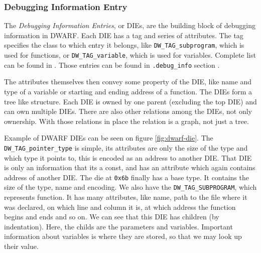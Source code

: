 \subsubsection{Debugging Information Entry}
The \textit{Debugging Information Entries}, or DIEs, are the building block of
debugging information in DWARF. Each DIE has a tag and series of attributes.
The tag specifies the class to which entry it belongs, like
\texttt{DW\_TAG\_subprogram}, which is used for functions, or
\texttt{DW\_TAG\_variable}, which is used for variables. Complete list can be
found in \cite{dwarf}. Those entries can be found in \texttt{.debug\_info}
section \cite{dwarf}.

The attributes themselves then convey some property of the DIE, like name and
type of a variable or starting and ending address of a function. The DIEs form
a tree like structure. Each DIE is owned by one parent (excluding the top DIE)
and can own multiple DIEs. There are also other relations among the DIEs, not
only ownership. With those relations in place the relation is a graph, not just
a tree.

Example of DWARF DIEs can be seen on figure \ref{fig:dwarf-die}. The \texttt{DW\_TAG\_pointer\_type} is
simple, its attributes are only the size of the type and which type it points to, this is encoded as an
address to another DIE. That DIE is only an information that its a const, and has an attribute which
again contains address of another DIE. The die at \texttt{0x6b} finally has a base type. It contains
the size of the type, name and encoding. We also have the \texttt{DW\_TAG\_SUBPROGRAM}, which represents
function. It has many attributes, like name, path to the file where it was declared, on which line
and column it is, at which address the function begins and ends and so on. We can see that this DIE
has children (by indentation). Here, the childs are the parameters and variables. Important
information about variables is where they are stored, so that we may look up their value.

